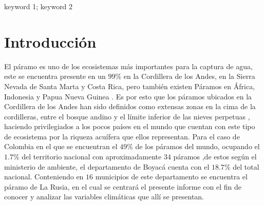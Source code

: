 \documentclass[conference,final,]{IEEEtran}
\begin{document}
\begin{IEEEkeywords}
keyword 1; keyword 2
\end{IEEEkeywords}




\maketitle


%
\IEEEpeerreviewmaketitle


\hypertarget{introducciuxf3n}{%
\section{Introducción}\label{introducciuxf3n}}

El páramo es uno de los ecosistemas más importantes para la captura de
agua, este se encuentra presente en un \(99 \%\) en la Cordillera de los
Andes, en la Sierra Nevada de Santa Marta y Costa Rica, pero también
existen Páramos en África, Indonesia y Papua Nueva Guinea
\cite{cabrera}. Es por esto que los páramos ubicados en la Cordillera de
los Andes han sido definidos como extensas zonas en la cima de la
cordilleras, entre el bosque andino y el límite inferior de las nieves
perpetuas \cite{cabrera}, haciendo privilegiados a los pocos países en
el mundo que cuentan con este tipo de ecosistema por la riqueza acuífera
que ellos representan. Para el caso de Colombia en el que se encuentran
el \(49 \%\) de los páramos del mundo, ocupando el \(1.7 \%\) del
territorio nacional con aproximadamente \(34\) páramos \cite{cabrera},de
estos según el ministerio de ambiente, el departamento de Boyacá cuenta
con el \(18.7 \%\) del total nacional. Conteniendo en \(16\) municipios
de este departamento se encuentra el páramo de La Rusia, en el cual se
centrará el presente informe con el fin de conocer y analizar las
variables climáticas que allí se presentan.
\end{document}
